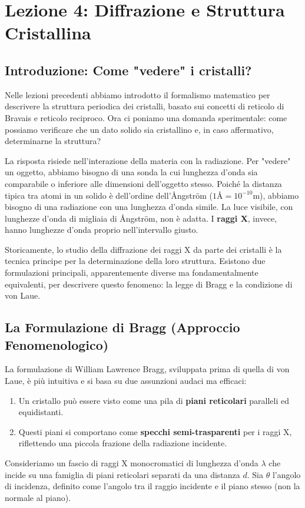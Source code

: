 \section{Lezione 4: Diffrazione e Struttura Cristallina}
\label{appendix:lesson04}

\subsection{Introduzione: Come "vedere" i cristalli?}
Nelle lezioni precedenti abbiamo introdotto il formalismo matematico per descrivere la struttura periodica dei cristalli, basato sui concetti di reticolo di Bravais e reticolo reciproco. Ora ci poniamo una domanda sperimentale: come possiamo verificare che un dato solido sia cristallino e, in caso affermativo, determinarne la struttura?

La risposta risiede nell'interazione della materia con la radiazione. Per "vedere" un oggetto, abbiamo bisogno di una sonda la cui lunghezza d'onda sia comparabile o inferiore alle dimensioni dell'oggetto stesso. Poiché la distanza tipica tra atomi in un solido è dell'ordine dell'Ångström ($1\text{Å} = 10^{-10} \text{m}$), abbiamo bisogno di una radiazione con una lunghezza d'onda simile. La luce visibile, con lunghezze d'onda di migliaia di Ångström, non è adatta. I \textbf{raggi X}, invece, hanno lunghezze d'onda proprio nell'intervallo giusto.

Storicamente, lo studio della diffrazione dei raggi X da parte dei cristalli è la tecnica principe per la determinazione della loro struttura. Esistono due formulazioni principali, apparentemente diverse ma fondamentalmente equivalenti, per descrivere questo fenomeno: la legge di Bragg e la condizione di von Laue.

\subsection{La Formulazione di Bragg (Approccio Fenomenologico)}
La formulazione di William Lawrence Bragg, sviluppata prima di quella di von Laue, è più intuitiva e si basa su due assunzioni audaci ma efficaci:
\begin{enumerate}
    \item Un cristallo può essere visto come una pila di \textbf{piani reticolari} paralleli ed equidistanti.
    \item Questi piani si comportano come \textbf{specchi semi-trasparenti} per i raggi X, riflettendo una piccola frazione della radiazione incidente.
\end{enumerate}
Consideriamo un fascio di raggi X monocromatici di lunghezza d'onda $\lambda$ che incide su una famiglia di piani reticolari separati da una distanza $d$. Sia $\theta$ l'angolo di incidenza, definito come l'angolo tra il raggio incidente e il piano stesso (non la normale al piano).




